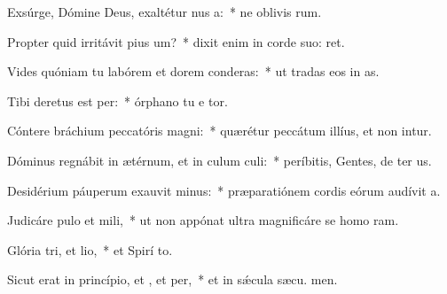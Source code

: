 \item Exsúrge, Dómine Deus, exaltétur nus a:~* ne oblivis rum.
\item Propter quid irritávit pius um?~* dixit enim in corde suo:  ret.
\item Vides quóniam tu labórem et dorem conderas:~* ut tradas eos in  as.
\item Tibi deretus est per:~* órphano tu e tor.
\item Cóntere bráchium peccatóris  magni:~* quærétur peccátum illíus, et non intur.
\item Dóminus regnábit in ætérnum, et in culum culi:~* períbitis, Gentes, de ter us.
\item Desidérium páuperum exauvit minus:~* præparatiónem cordis eórum audívit  a.
\item Judicáre pulo et mili,~* ut non appónat ultra magnificáre se homo  ram.
\item Glória tri, et lio,~* et Spirí to.
\item Sicut erat in princípio, et , et per,~* et in sǽcula sæcu. men.
